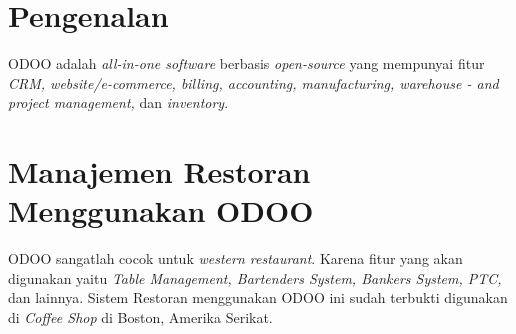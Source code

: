\section{Pengenalan}
ODOO adalah \textit{all-in-one software} berbasis \textit{open-source} yang mempunyai fitur \textit{ CRM, website/e-commerce, billing, accounting, manufacturing, warehouse - and project management,} dan \textit{inventory}.
\section{Manajemen Restoran Menggunakan ODOO}
ODOO sangatlah cocok untuk \textit{western restaurant}. Karena fitur yang akan digunakan yaitu \textit{Table Management, Bartenders System, Bankers System, PTC,} dan lainnya. Sistem Restoran menggunakan ODOO ini sudah terbukti digunakan di \textit{Coffee Shop} di Boston, Amerika Serikat.